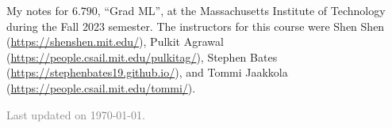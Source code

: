 \documentclass[11pt]{article}
\begin{document}
\maketitle

My notes for $6.790$, ``Grad ML'', at the Massachusetts Institute of Technology during the Fall 2023 semester. The instructors for this course were Shen Shen (\url{https://shenshen.mit.edu/}), Pulkit Agrawal (\url{https://people.csail.mit.edu/pulkitag/}), Stephen Bates (\url{https://stephenbates19.github.io/}), and Tommi Jaakkola (\url{https://people.csail.mit.edu/tommi/}). 

\vfill

\hfill \textcolor{gray}{\small Last updated on \today.}
\newpage
\tableofcontents 
\newpage
\importfiles %
\end{document}
